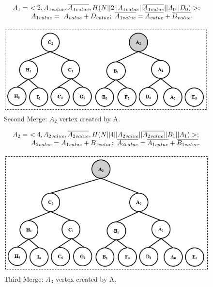 		\begin{equation*}
			\begin{array}{l}
				A_{1} =\  < 2, A_{1value}, \overline{A_{1value}}, H(N || 2 || A_{1value}|| \overline{A_{1value}} || A_{0} || D_{0})>;\\
				\textcolor{white}{XXX} A_{1value} =\  A_{value} + D_{value};\ \overline{A_{1value}} = \overline{A_{value}} + \overline{D_{value}}.
			\end{array}
		\end{equation*}
		\begin{figure}[h!]
			\centering
			\includegraphics{images/commitment-tree-example-3-shia.png}
			\caption{Second Merge: $A_{2}$ vertex created by A.}
			\label{fig:commitment-tree-example-3-shia}
		\end{figure}
		\begin{equation*}
			\begin{array}{l}
				A_{2} =\ <4, A_{2value}, \overline{A_{2value}}, H(N || 4 || A_{2value} || \overline{A_{2value}} || B_{1} ||A_{1}) >;\\
				\textcolor{white}{XXX} A_{2value} = A_{1value} + B_{1value};\ \overline{A_{2value}} = \overline{A_{1value}} + \overline{B_{1value}} .
			\end{array}
		\end{equation*}
		\begin{figure}[h!]
			\centering
			\includegraphics{images/commitment-tree-example-4-shia.png}
			\caption{Third Merge: $A_{3}$ vertex created by A.}
			\label{fig:commitment-tree-example-4-shia}
		\end{figure}
